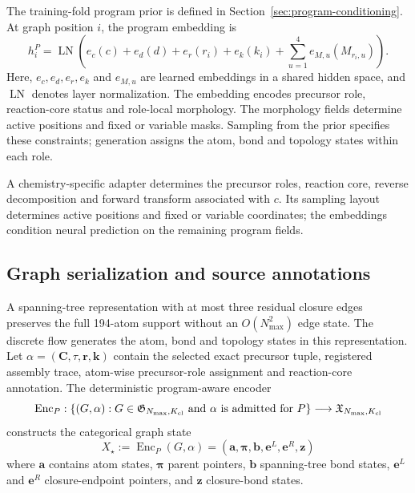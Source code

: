 \documentclass{article}
\theoremstyle{definition}
\begin{document}
The training-fold program prior is defined in Section~\ref{sec:program-conditioning}.
At graph position $i$, the program embedding is
\begin{equation}
    h_i^P=\operatorname{LN}\!\left(
        e_c(c)+e_d(d)+e_r(r_i)+e_k(k_i)
        +\sum_{u=1}^{4}e_{M,u}(M_{r_i,u})
    \right).
\end{equation}
Here, $e_c,e_d,e_r,e_k$ and $e_{M,u}$ are learned embeddings in a shared hidden space, and
$\operatorname{LN}$ denotes layer normalization. The embedding encodes precursor role, reaction-core
status and role-local morphology. The morphology fields determine active positions and fixed or
variable masks. Sampling from the prior specifies these constraints; generation assigns the atom,
bond and topology states within each role.

A chemistry-specific adapter determines the precursor roles, reaction core, reverse decomposition
and forward transform associated with $c$. Its sampling layout determines active positions and
fixed or variable coordinates; the embeddings condition neural prediction on the remaining
program fields.

\subsection{Graph serialization and source annotations}
\label{app:graph-encoding}

A spanning-tree representation with at most three residual closure edges preserves the full
194-atom support without an $O(N_{\max}^2)$ edge state. The discrete flow generates the atom, bond
and topology states in this representation.
Let $\alpha=(\mathbf C,\tau,\mathbf r,\mathbf k)$ contain the selected exact precursor tuple,
registered assembly trace, atom-wise precursor-role assignment and reaction-core annotation. The deterministic
program-aware encoder
\begin{equation}
    \operatorname{Enc}_P:
    \{(G,\alpha):G\in\mathfrak G_{N_{\max},K_{\rm cl}}
      \text{ and }\alpha\text{ is admitted for }P\}
    \longrightarrow \mathfrak X_{N_{\max},K_{\rm cl}}
\end{equation}
constructs the categorical graph state
\begin{equation}
    X_\star:=\operatorname{Enc}_P(G,\alpha)=
    \left(
        \mathbf{a},
        \boldsymbol{\pi},
        \mathbf{b},
        \mathbf{e}^{L},
        \mathbf{e}^{R},
        \mathbf{z}
    \right)
\end{equation}
where $\mathbf{a}$ contains atom states, $\boldsymbol{\pi}$
parent pointers, $\mathbf{b}$ spanning-tree bond states, $\mathbf{e}^{L}$ and $\mathbf{e}^{R}$
closure-endpoint pointers, and $\mathbf{z}$ closure-bond states.
\end{document}
